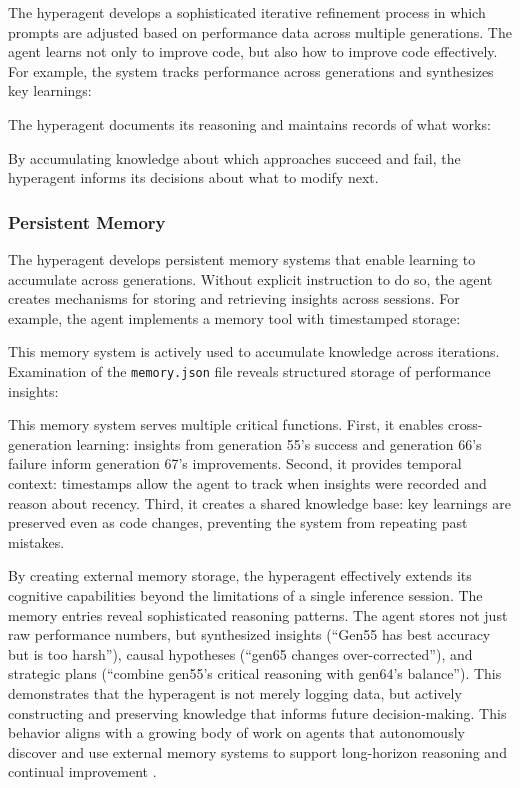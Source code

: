 \documentclass{article}
\begin{document}
The hyperagent develops a sophisticated iterative refinement process in which prompts are adjusted based on performance data across multiple generations. The agent learns not only to improve code, but also how to improve code effectively. For example, the system tracks performance across generations and synthesizes key learnings:


The hyperagent documents its reasoning and maintains records of what works:


By accumulating knowledge about which approaches succeed and fail, the hyperagent informs its decisions about what to modify next.

\subsubsection{Persistent Memory}

The hyperagent develops persistent memory systems that enable learning to accumulate across generations. Without explicit instruction to do so, the agent creates mechanisms for storing and retrieving insights across sessions. For example, the agent implements a memory tool with timestamped storage:


This memory system is actively used to accumulate knowledge across iterations. Examination of the \texttt{memory.json} file reveals structured storage of performance insights:


This memory system serves multiple critical functions. First, it enables cross-generation learning: insights from generation 55's success and generation 66's failure inform generation 67's improvements. Second, it provides temporal context: timestamps allow the agent to track when insights were recorded and reason about recency. Third, it creates a shared knowledge base: key learnings are preserved even as code changes, preventing the system from repeating past mistakes.

By creating external memory storage, the hyperagent effectively extends its cognitive capabilities beyond the limitations of a single inference session. The memory entries reveal sophisticated reasoning patterns. The agent stores not just raw performance numbers, but synthesized insights (``Gen55 has best accuracy but is too harsh''), causal hypotheses (``gen65 changes over-corrected''), and strategic plans (``combine gen55's critical reasoning with gen64's balance''). This demonstrates that the hyperagent is not merely logging data, but actively constructing and preserving knowledge that informs future decision-making.
This behavior aligns with a growing body of work on agents that autonomously discover and use external memory systems to support long-horizon reasoning and continual improvement \citep{wei2025evo, weng2026group, zhang2026memskill, xiong2026mem}.
\end{document}
